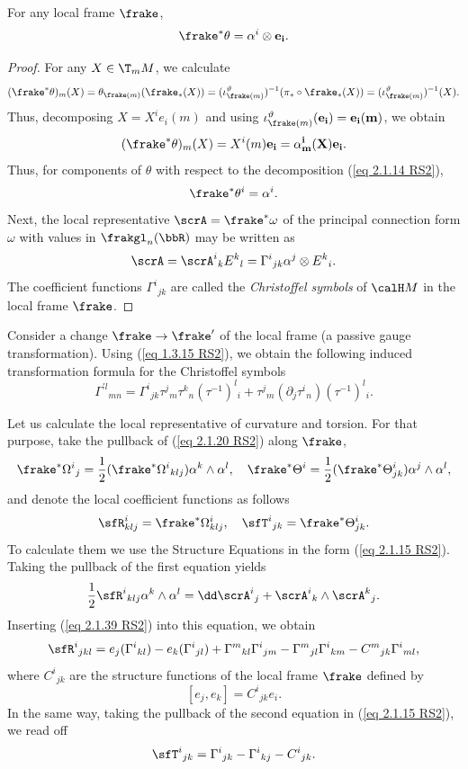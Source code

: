 \begin{lem}[{{\cite[Lem.~2.1.26]{RS2}}}]\label{lem 2.1.26 RS2}
    For any local frame $\frake$,
    \[\frake^\ast \theta=\alpha^i\otimes\bf{e}_i.\]
\end{lem}
\begin{proof}
    For any $X\in \T_mM$, we calculate 
    \[(\frake^\ast \theta)_m(X)=\theta_{\frake(m)}(\frake_\ast(X))=(\iota^\vartheta_{\frake(m)})^{-1}(\pi_\ast\circ\frake_\ast(X))=(\iota^\vartheta_{\frake(m)})^{-1}(X).\]
    Thus, decomposing $X=X^ie_i(m)$ and using $\iota^\vartheta_{\frake(m)}(\bf{e}_i)=e_i(m)$, we obtain
    \[(\frake^\ast\theta)_m(X)=X^i(m)\bf{e}_i=\alpha^i_m(X)\bf{e}_i.\]
    Thus, for components of $\theta$ with respect to the decomposition (\ref{eq 2.1.14 RS2}),
    \[\frake^\ast \theta^i=\alpha^i.\]
    Next, the local representative $\scrA=\frake^\ast\omega$ of the principal connection form $\omega$ with values in $\frakgl_n(\bbR)$ may be written as 
    \[\scrA=\scrA^i{}_k E^k{}_l=\Gamma^i{}_{jk}\alpha^j\otimes E^k{}_i.\label{eq 2.1.39 RS2}\]
    The coefficient functions $\Gamma^i{}_{jk}$ are called the \emph{Christoffel symbols} of $\calH M$ in the local frame $\frake$.
\end{proof}

\begin{rem}
    Consider a change $\frake\to \frake'$ of the local frame (a passive gauge transformation). Using (\ref{eq 1.3.15 RS2}), we obtain the following induced transformation formula for the Christoffel symbols 
    \[\Gamma^{\prime l}{}_{mn}=\Gamma^i{}_{jk}\tau^j{}_m \tau^k{}_n(\tau^{-1})^l{}_i+\tau^j{}_m(\partial_j \tau^i{}_n)(\tau^{-1})^l{}_i.\label{eq 2.1.40 RS2}\]
\end{rem}

Let us calculate the local representative of curvature and torsion. For that purpose, take the pullback of (\ref{eq 2.1.20 RS2}) along $\frake$,
\[\frake^\ast \Omega^i{}_j=\frac12(\frake^\ast\Omega^i{}_{klj})\alpha^k\wedge\alpha^l,\quad \frake^\ast\Theta^i=\frac12(\frake^\ast\Theta^i_{jk})\alpha^j\wedge\alpha^l,\]
and denote the local coefficient functions as follows 
\[\sfR^i_{klj}=\frake^\ast\Omega^i_{klj},\quad \sfT^i{}_{jk}=\frake^\ast\Theta^i_{jk}.\]
To calculate them we use the Structure Equations in the form (\ref{eq 2.1.15 RS2}). Taking the pullback of the first equation yields 
\[\frac12\sfR^i{}_{klj}\alpha^k\wedge\alpha^l=\dd\scrA^i{}_j+\scrA^i{}_k\wedge \scrA^k{}_j.\]
Inserting (\ref{eq 2.1.39 RS2}) into this equation, we obtain 
\[\sfR^i{}_{jkl}=e_j(\Gamma^i{}_{kl})-e_k(\Gamma^i{}_{jl})+\Gamma^m{}_{kl}\Gamma^i{}_{jm}-\Gamma^m{}_{jl}\Gamma^i{}_{km}-C^m{}_{jk}\Gamma^i{}_{ml},\label{eq 2.1.42 RS2}\]
where $C^i{}_{jk}$ are the structure functions of the local frame $\frake$ defined by 
\[[e_j,e_k]=C^i{}_{jk}e_i.\]
In the same way, taking the pullback of the second equation in (\ref{eq 2.1.15 RS2}), we read off 
\[\sfT^i{}_{jk}=\Gamma^i{}_{jk}-\Gamma^i{}_{kj}-C^i{}_{jk}.\label{eq 2.1.44 RS2}\]

